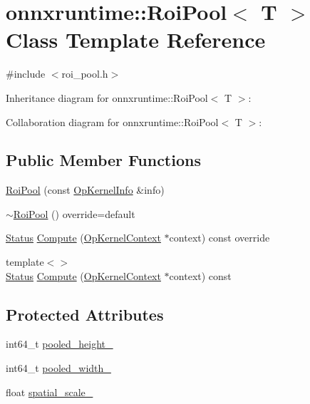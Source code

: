 \hypertarget{classonnxruntime_1_1RoiPool}{}\section{onnxruntime\+:\+:Roi\+Pool$<$ T $>$ Class Template Reference}
\label{classonnxruntime_1_1RoiPool}


{\ttfamily \#include $<$roi\+\_\+pool.\+h$>$}



Inheritance diagram for onnxruntime\+:\+:Roi\+Pool$<$ T $>$\+:


Collaboration diagram for onnxruntime\+:\+:Roi\+Pool$<$ T $>$\+:
\subsection*{Public Member Functions}
\begin{DoxyCompactItemize}
\item 
\mbox{\hyperlink{classonnxruntime_1_1RoiPool_a1514fc4ca98cf9dd544e0c1a8bfd50d6}{Roi\+Pool}} (const \mbox{\hyperlink{classonnxruntime_1_1OpKernelInfo}{Op\+Kernel\+Info}} \&info)
\item 
\mbox{\hyperlink{classonnxruntime_1_1RoiPool_a6712739433c59b6e53d6fce011045227}{$\sim$\+Roi\+Pool}} () override=default
\item 
\mbox{\hyperlink{classonnxruntime_1_1common_1_1Status}{Status}} \mbox{\hyperlink{classonnxruntime_1_1RoiPool_a740a995505ed3209a2e046a2f9a986d8}{Compute}} (\mbox{\hyperlink{classonnxruntime_1_1OpKernelContext}{Op\+Kernel\+Context}} $\ast$context) const override
\item 
{\footnotesize template$<$$>$ }\\\mbox{\hyperlink{classonnxruntime_1_1common_1_1Status}{Status}} \mbox{\hyperlink{classonnxruntime_1_1RoiPool_af94d63c78ed3f66971133d016d5671e6}{Compute}} (\mbox{\hyperlink{classonnxruntime_1_1OpKernelContext}{Op\+Kernel\+Context}} $\ast$context) const
\end{DoxyCompactItemize}
\subsection*{Protected Attributes}
\begin{DoxyCompactItemize}
\item 
int64\+\_\+t \mbox{\hyperlink{classonnxruntime_1_1RoiPool_ac557259983736250c4f3438308c64d88}{pooled\+\_\+height\+\_\+}}
\item 
int64\+\_\+t \mbox{\hyperlink{classonnxruntime_1_1RoiPool_afdaf8c70e9c6139ea9e17673dc1db06f}{pooled\+\_\+width\+\_\+}}
\item 
float \mbox{\hyperlink{classonnxruntime_1_1RoiPool_ae631cac948e679021883d9daa39dba81}{spatial\+\_\+scale\+\_\+}}
\end{DoxyCompactItemize}
